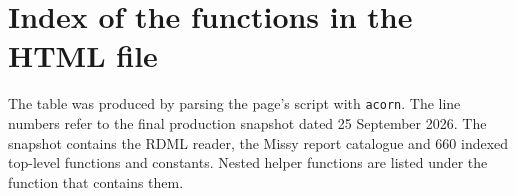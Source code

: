 \chapter{Index of the functions in the HTML file}\label{app:index}
The table was produced by parsing the page's script with \texttt{acorn}. The line numbers refer to the final production snapshot dated 25 September 2026. The snapshot contains the RDML reader, the Missy report catalogue and 660 indexed top-level functions and constants. Nested helper functions are listed under the function that contains them.




